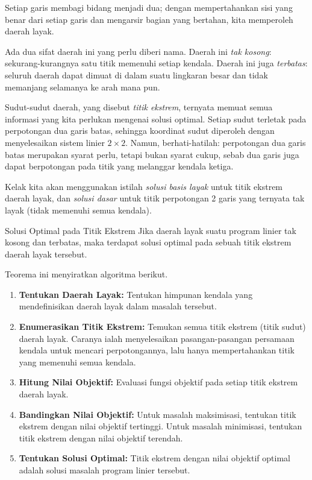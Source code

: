 Setiap garis membagi bidang menjadi dua; dengan mempertahankan sisi yang benar dari setiap garis dan mengarsir bagian yang bertahan, kita memperoleh daerah layak.

Ada dua sifat daerah ini yang perlu diberi nama. Daerah ini \emph{tak kosong}: sekurang-kurangnya satu titik memenuhi setiap kendala. Daerah ini juga \emph{terbatas}: seluruh daerah dapat dimuat di dalam suatu lingkaran besar dan tidak memanjang selamanya ke arah mana pun.

Sudut-sudut daerah, yang disebut \emph{titik ekstrem}, ternyata memuat semua informasi yang kita perlukan mengenai solusi optimal. Setiap sudut terletak pada perpotongan dua garis batas, sehingga koordinat sudut diperoleh dengan menyelesaikan sistem linier $2 \times 2$. Namun, berhati-hatilah: perpotongan dua garis batas merupakan syarat perlu, tetapi bukan syarat cukup, sebab dua garis juga dapat berpotongan pada titik yang melanggar kendala ketiga.

Kelak kita akan menggunakan istilah \emph{solusi basis layak} untuk titik ekstrem daerah layak, dan \emph{solusi dasar} untuk titik perpotongan 2 garis yang ternyata tak layak (tidak memenuhi semua kendala).

\begin{theorem}{Solusi Optimal pada Titik Ekstrem}\label{thm:optimalextremepoint}
Jika daerah layak suatu program linier tak kosong dan terbatas, maka terdapat solusi optimal pada sebuah titik ekstrem daerah layak tersebut.
\end{theorem}

Teorema ini menyiratkan algoritma berikut.
\begin{algorithm}[H]
\caption{Algoritma Enumerasi Titik Ekstrem untuk Menyelesaikan Masalah Program Linier}
\label{alg:EnumerateVertices}
\begin{enumerate}
    \item \textbf{Tentukan Daerah Layak:}
    Tentukan himpunan kendala yang mendefinisikan daerah layak dalam masalah tersebut.
    \item \textbf{Enumerasikan Titik Ekstrem:}
    Temukan semua titik ekstrem (titik sudut) daerah layak. Caranya ialah menyelesaikan pasangan-pasangan persamaan kendala untuk mencari perpotongannya, lalu hanya mempertahankan titik yang memenuhi semua kendala.
    \item \textbf{Hitung Nilai Objektif:}
    Evaluasi fungsi objektif pada setiap titik ekstrem daerah layak.
    \item \textbf{Bandingkan Nilai Objektif:}
    Untuk masalah maksimisasi, tentukan titik ekstrem dengan nilai objektif tertinggi. Untuk masalah minimisasi, tentukan titik ekstrem dengan nilai objektif terendah.
    \item \textbf{Tentukan Solusi Optimal:}
    Titik ekstrem dengan nilai objektif optimal adalah solusi masalah program linier tersebut.
\end{enumerate}
\end{algorithm}

